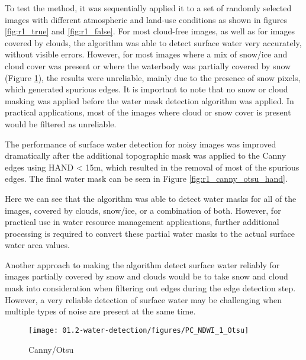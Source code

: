 To test the method, it was sequentially applied it to a set of randomly selected images with different atmospheric and land-use conditions as shown in figures \ref{fig:r1_true} and \ref{fig:r1_false}. For most cloud-free images, as well as for images covered by clouds, the algorithm was able to detect surface water very accurately, without visible errors. However, for most images where a mix of snow/ice and cloud cover was present or where the waterbody was partially covered by snow (Figure \ref{fig:r1_canny_otsu}), the results were unreliable, mainly due to the presence of snow pixels, which generated spurious edges. It is important to note that no snow or cloud masking was applied before the water mask detection algorithm was applied. In practical applications, most of the images where cloud or snow cover is present would be filtered as unreliable.

The performance of surface water detection for noisy images was improved dramatically after the additional topographic mask was applied to the Canny edges using HAND < 15m, which resulted in the removal of most of the spurious edges. The final water mask can be seen in Figure \ref{fig:r1_canny_otsu_hand}.

Here we can see that the algorithm was able to detect water masks for all of the images, covered by clouds, snow/ice, or a combination of both. However, for practical use in water resource management applications, further additional processing is required to convert these partial water masks to the actual surface water area values.

Another approach to making the algorithm detect surface water reliably for images partially covered by snow and clouds would be to take snow and cloud mask into consideration when filtering out edges during the edge detection step. However, a very reliable detection of surface water may be challenging when multiple types of noise are present at the same time.

\begin{comment}
\begin{figure}[H]
	\centering
	\texttt{[image: 01.2-water-detection/figures/PC\_NDWI\_0]}
	\caption{NDWI=0}
	\label{fig:r1_ndwi0}
\end{figure}
\end{comment}

\begin{figure}[H]
	\centering
	\texttt{[image: 01.2-water-detection/figures/PC\_NDWI\_1\_Otsu]}
	\caption{Canny/Otsu}
	\label{fig:r1_canny_otsu}
\end{figure}


